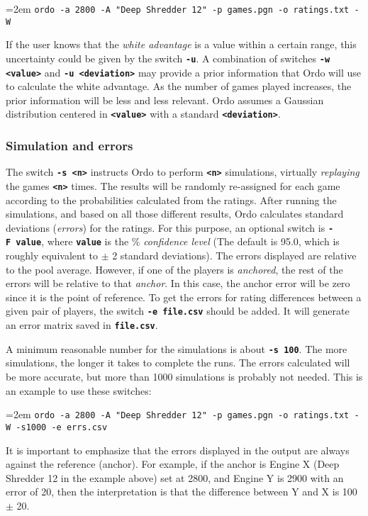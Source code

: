 \documentclass[12pt]{article}
\newcommand{\swtch} [1] {\texttt{\textbf{#1}}}
\newcommand{\cmdln}[1]{
	\par
	\begingroup
		\leftskip=2em
		\addtolength{\rightskip}{0em}
		\noindent \small{\texttt{#1}}
		\par
	\endgroup
}
\begin{document}
	\cmdln{ordo -a 2800 -A "Deep Shredder 12" -p games.pgn -o ratings.txt -W}

If the user knows that the \textit{white advantage} is a value within a certain range, this uncertainty could be given by the switch \swtch{-u}. 
A combination of switches \swtch{-w <value>} and \swtch{-u <deviation>} may provide a prior information that Ordo will use to calculate the white advantage.
As the number of games played increases, the prior information will be less and less relevant.
Ordo assumes a Gaussian distribution centered in \swtch{<value>} with a standard \swtch{<deviation>}.

\subsubsection*{Simulation and errors}

The switch \swtch{-s~<n>} instructs Ordo to perform \swtch{<n>} simulations, virtually \textit{replaying} the games \swtch{<n>} times.
The results will be randomly re-assigned for each game according to the probabilities calculated from the ratings. 
After running the simulations, and based on all those different results, Ordo calculates standard deviations (\textit{errors}) for the ratings.
For this purpose, an optional switch is \swtch{-F~value}, where \swtch{value} is the \% \textit{confidence level} (The default is 95.0, which is roughly equivalent to $\pm$ 2 standard deviations).
The errors displayed are relative to the pool average. 
However, if one of the players is \textit{anchored}, the rest of the errors will be relative to that \textit{anchor}.
In this case, the anchor error will be zero since it is the point of reference.
To get the errors for rating differences between a given pair of players, the switch \swtch{-e~file.csv} should be added.
It will generate an error matrix saved in \swtch{file.csv}.

A minimum reasonable number for the simulations is about \swtch{-s~100}. 
The more simulations, the longer it takes to complete the runs. 
The errors calculated will be more accurate, but more than 1000 simulations is probably not needed. 
This is an example to use these switches:

\cmdln{ordo -a 2800 -A "Deep Shredder 12" -p games.pgn -o ratings.txt -W -s1000 -e errs.csv}

It is important to emphasize that the errors displayed in the output are always against the reference (anchor). 
For example, if the anchor is Engine X (Deep Shredder 12 in the example above) set at 2800, and Engine Y is 2900 with an error of 20, then the interpretation is that the difference between Y and X is 100 $\pm$ 20. 
\end{document}

